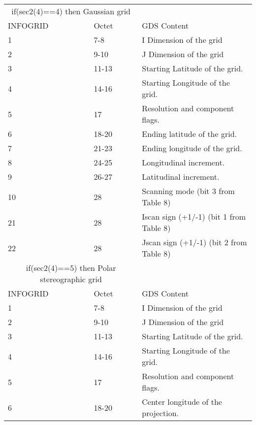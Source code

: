 \begin{longtable}{l|l|l}
\hline
\multicolumn{2}{c}{if(sec2(4)==4) then Gaussian grid} & \\
INFOGRID & Octet & GDS Content \\
\hline
    1 &          7-8  &  I Dimension of the grid   \\                                
     2 &        9-10  &  J Dimension of the grid     \\                              
     3 &      11-13  &  Starting Latitude of the grid. \\                           
     4 &      14-16  &  Starting Longitude of the grid.  \\                         
     5 &           17  &  Resolution and component flags. \\                          
     6 &      18-20  &  Ending latitude of the grid.   \\                           
     7 &      21-23  &  Ending longitude of the grid. \\                            
     8 &      24-25  &  Longitudinal increment.  \\                                 
     9 &      26-27  &  Latitudinal increment.     \\                               
    10 &          28  &  Scanning mode (bit 3 from Table 8) \\                       
    21 &          28  &  Iscan sign (+1/-1) (bit 1 from Table 8) \\                  
    22 &          28  &  Jscan sign (+1/-1) (bit 2 from Table 8) \\  
\hline
\multicolumn{2}{c}{if(sec2(4)==5) then Polar stereographic grid }& \\
INFOGRID & Octet & GDS Content \\
\hline
       1 &          7-8  &  I Dimension of the grid  \\
       2 &        9-10  &  J Dimension of the grid   \\                                
       3 &      11-13  &  Starting Latitude of the grid.\\                            
       4 &      14-16  &  Starting Longitude of the grid. \\                          
       5 &         17 &  Resolution and component flags.  \\                         
       6 &        18-20 &  Center longitude of the projection. \\                      

\end{longtable}
